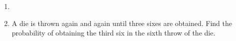 \begin{enumerate}[label=\thechapter.\arabic*,ref=\thechapter.\theenumi]
\item 
\item A die is thrown again and again until three sixes are obtained. Find the probability of obtaining the third six in the sixth throw of the die.
\end{enumerate}
